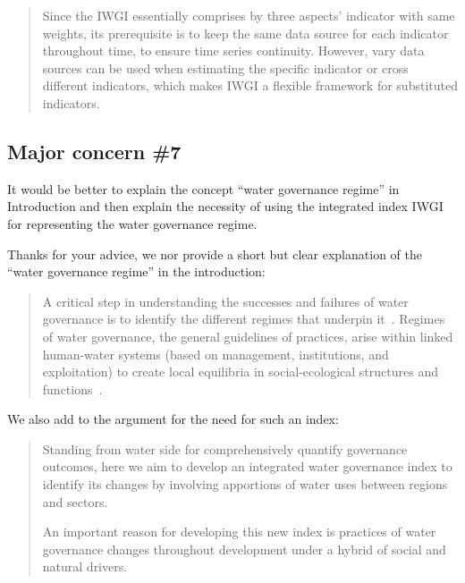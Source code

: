\begin{quote}
	Since the IWGI essentially comprises by three aspects' indicator with same weights, its prerequisite is to keep the same data source for each indicator throughout time, to ensure time series continuity.
	However, vary data sources can be used when estimating the specific indicator or cross different indicators, which makes IWGI a flexible framework for substituted indicators.
\end{quote}

\subsection{Major concern \#7}
\RC{} It would be better to explain the concept ``water governance regime'' in Introduction and then explain the necessity of using the integrated index IWGI for representing the water governance regime.

\AR{} Thanks for your advice, we nor provide a short but clear explanation of the ``water governance regime'' in the introduction:

\begin{quote}
	A critical step in understanding the successes and failures of water governance is to identify the different regimes that underpin it~\cite{kjellen2015, grafton2013}.
	Regimes of water governance, the general guidelines of practices, arise within linked human-water systems (based on management, institutions, and exploitation) to create local equilibria in social-ecological structures and functions~\cite{falkenmark2021,bressers2013,loch2020,pahl-wostl2007}.
\end{quote}

\AR*{} We also add to the argument for the need for such an index:

\begin{quote}
	Standing from water side for comprehensively quantify governance outcomes, here we aim to develop an integrated water governance index to identify its changes by involving apportions of water uses between regions and sectors.

	An important reason for developing this new index is practices of water governance changes throughout development under a hybrid of social and natural drivers.
\end{quote}

